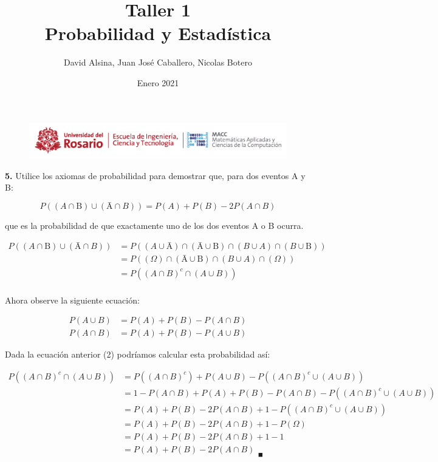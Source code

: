 \documentclass[a4paper,12pt]{article}
\title{Taller 1\\ Probabilidad y Estadística}
\author{David Alsina, Juan José Caballero, Nicolas Botero}
\date{Enero 2021}
\begin{document}
    \begin{figure}[ht]
		\centering
		\includegraphics[width = 17cm]{../header.png}
		\maketitle
    \end{figure}

	\textbf{5.} Utilice los axiomas de probabilidad para demostrar que, para dos eventos A y B:

	\begin{equation*}
		P((A \cap  \text{\={B}}) \cup (\text{\={A}} \cap B)) = P(A) + P(B) - 2P(A\cap B)
	\end{equation*}

	que es la probabilidad de que exactamente uno de los dos eventos A o B ocurra.

	\begin{align*}
		P((A \cap  \text{\={B}}) \cup (\text{\={A}} \cap B)) &= P( (A \cup \text{\={A}}) \cap (\text{\={A}} \cup \text{\={B}}) \cap (B \cup A) \cap (B \cup \text{\={B}}) )\\
		&= P( (\Omega) \cap (\text{\={A}} \cup \text{\={B}}) \cap (B \cup A) \cap (\Omega) )\\
		&= P( (A \cap B)^{c} \cap (A \cup B))\\
 	\end{align*}

	\begin{center}
		Ahora observe la siguiente ecuación:
	\end{center}
	\begin{align}
		P(A \cup  B) &= P(A) +  P(B) - P(A \cap B)\\
		P(A \cap B) &=  P(A) +  P(B) - P(A \cup B)
	\end{align}

	\begin{center}
		Dada la ecuación anterior (2) podríamos calcular esta probabilidad así:
	\end{center}

	\begin{align*}
		P( (A \cap B)^{c} \cap (A \cup B)) &= P((A \cap B)^{c}) + P(A \cup B) 
	- P((A \cap B)^{c} \cup (A \cup B)) \\
	&= 1 - P(A \cap B) + P(A) + P(B) - P(A \cap B)- P((A \cap B)^{c} \cup (A \cup B))\\
	&= P(A) + P(B) -2P(A \cap B) + 1 - P((A \cap B)^{c} \cup (A \cup B))\\
	&= P(A) + P(B) -2P(A \cap B) + 1 - P(\Omega)\\
	&= P(A) + P(B) -2P(A \cap B) + 1 - 1\\
	&= P(A) + P(B) -2P(A \cap B)_{\;\;\blacksquare}
	\end{align*}
\end{document}
